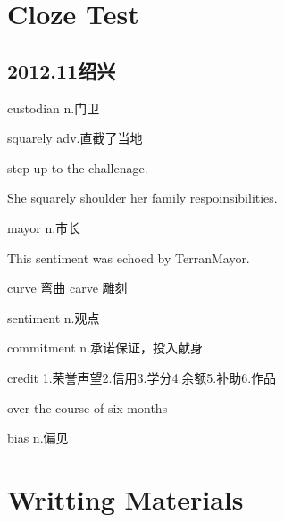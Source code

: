 \documentclass[utf8]{ctexart}
\begin{document}
	\section{Cloze Test}
	\subsection{2012.11绍兴}
	\par custodian n.门卫
	\par squarely adv.直截了当地	
	\par step up to the challenage.	
	\par She squarely shoulder her family respoinsibilities.	
	\par mayor n.市长
	\par This sentiment was echoed by TerranMayor.
	\par curve 弯曲 carve 雕刻
	\par sentiment n.观点
	\par commitment n.承诺保证，投入献身
	\par credit 1.荣誉声望2.信用3.学分4.余额5.补助6.作品
	\par over the course of six months
	\par bias n.偏见	
	
	
	\section{Writting Materials}
\end{document}
